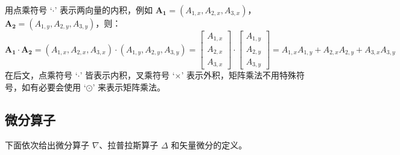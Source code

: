 \documentclass[UTF8]{report}
\theoremstyle{MyLineTheoremStyle} %
\theoremstyle{MyBlockTheoremStyle} %
\theoremstyle{MySubsubsectionStyle} %
\begin{document}
用点乘符号 `$\cdot$' 表示两向量的内积，例如 $\boldsymbol{A_1} = (A_{1,x}, A_{2,x}, A_{3,x})$，$\boldsymbol{A_2} = (A_{1,y}, A_{2,y}, A_{3,y})$，则：
\begin{equation}
    \boldsymbol{A_1} \cdot \boldsymbol{A_2} = (A_{1,x}, A_{2,x}, A_{3,x})\cdot (A_{1,y}, A_{2,y}, A_{3,y}) = 
    \begin{bmatrix}
        A_{1,x} \\ A_{2,x} \\ A_{3,x}
    \end{bmatrix}\cdot
    \begin{bmatrix}
        A_{1,y} \\ A_{2,y} \\ A_{3,y}
    \end{bmatrix} =
    A_{1,x}A_{1,y} + A_{2,x}A_{2,y} + A_{3,x}A_{3,y}
\end{equation}
在后文，点乘符号 `$\cdot$' 皆表示内积，叉乘符号 `$\times$' 表示外积，矩阵乘法不用特殊符号，如有必要会使用 `$\odot $' 来表示矩阵乘法。


\subsection{微分算子}

下面依次给出微分算子 $\nabla$、拉普拉斯算子 $\Delta$ 和矢量微分的定义。
\end{document}
